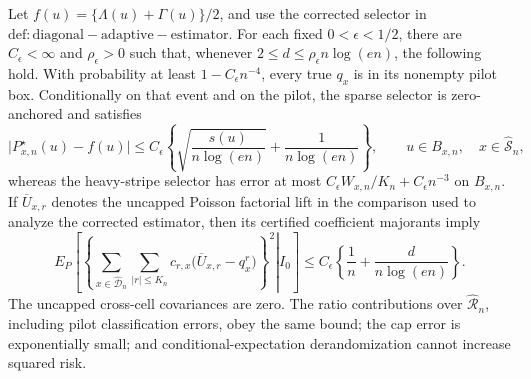 Let \(f(u)=\{\Lambda(u)+\Gamma(u)\}/2\), and use the corrected selector in \(\mathrm{def:diagonal-adaptive-estimator}\).  For each fixed \(0<\epsilon<1/2\), there are \(C_\epsilon<\infty\) and \(\rho_\epsilon>0\) such that, whenever \(2\le d\le\rho_\epsilon n\log(en)\), the following hold.  With probability at least \(1-C_\epsilon n^{-4}\), every true \(q_x\) is in its nonempty pilot box.  Conditionally on that event and on the pilot, the sparse selector is zero-anchored and satisfies
\[
 \lvert P^\star_{x,n}(u)-f(u)\rvert
 \le C_\epsilon\left\{
  \sqrt{\frac{s(u)}{n\log(en)}}+
  \frac1{n\log(en)}
 \right\},
 \qquad u\in B_{x,n},\quad x\in\widehat{\mathcal S}_n,
\]
whereas the heavy-stripe selector has error at most \(C_\epsilon W_{x,n}/K_n+C_\epsilon n^{-3}\) on \(B_{x,n}\).  If \(\overline U_{x,r}\) denotes the uncapped Poisson factorial lift in the comparison used to analyze the corrected estimator, then its certified coefficient majorants imply
\[
 E_P\!\left[
  \left.
  \left\{
   \sum_{x\in\widehat{\mathcal D}_n}
   \sum_{\lvert r\rvert\le K_n}c_{r,x}
    \bigl(\overline U_{x,r}-q_x^r\bigr)
  \right\}^{\!2}
  \right|I_0
 \right]
 \le C_\epsilon\left\{\frac1n+\frac{d}{n\log(en)}\right\}.
\]
The uncapped cross-cell covariances are zero.  The ratio contributions over \(\widehat{\mathcal R}_n\), including pilot classification errors, obey the same bound; the cap error is exponentially small; and conditional-expectation derandomization cannot increase squared risk.